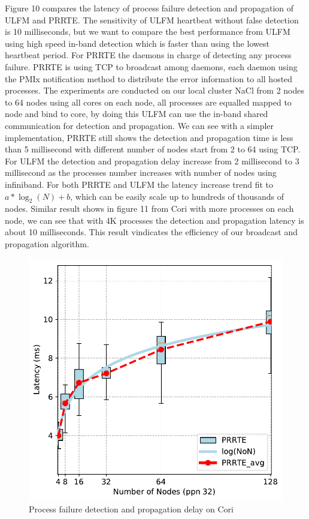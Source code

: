 \documentclass[sigconf]{acmart}
\begin{document}
Figure 10 compares the latency of process failure detection and propagation of ULFM and PRRTE. The sensitivity of ULFM heartbeat without false detection is 10 milliseconds, but we want to compare the best performance from ULFM using high speed in-band detection which is faster than using the lowest heartbeat period. For PRRTE the daemons in charge of detecting any process failure. PRRTE is using TCP to broadcast among daemons, each daemon using the PMIx notification method to distribute the error information to all hosted processes. The experiments are conducted on our local cluster NaCl from 2 nodes to 64 nodes using all cores on each node, all processes are equalled mapped to node and bind to core, by doing this ULFM can use the in-band shared communication for detection and propagation. We can see with a simpler implementation, PRRTE still shows the detection and propagation time is less than 5 millisecond with different number of nodes start from 2 to 64 using TCP. For ULFM the detection and propagation delay increase from 2 millisecond to 3 millisecond as the processes number increases with number of nodes using infiniband. For both PRRTE and ULFM the latency increase trend fit to $ a*\log_2(N) + b $, which can be easily scale up to hundreds of thousands of nodes. Similar result shows in figure 11 from Cori with more processes on each node, we can see that with 4K processes the detection and propagation latency is about 10 milliseconds. This result vindicates the efficiency of our broadcast and propagation algorithm.  

\begin{figure}[h]
  \centering
  \includegraphics[width=\linewidth]{Cori_Process_Failure_fit.pdf}
  \caption{Process failure detection and propagation delay on Cori}
\end{figure}
\end{document}
